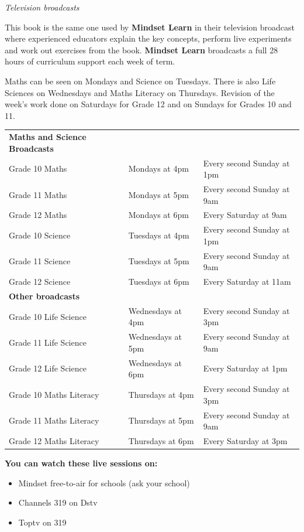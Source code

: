 {{\normalfont\sffamily\fontsize{22}\normalfont\itshape Television broadcasts} \par
This book is the same one used by \textbf{Mindset Learn} in their television broadcast where experienced
educators explain the key concepts, perform live experiments and work out exercises from the book.
\textbf{Mindset Learn} broadcasts a full 28 hours of curriculum support each week of term. \par


Maths can be seen on Mondays and Science on Tuesdays. There is also Life Sciences on Wednesdays
and Maths Literacy on Thursdays. Revision of the week's work done on Saturdays for Grade 12 and on
Sundays for Grades 10 and 11.


}




\newpage
\thispagestyle{empty}
{\Large

\begin{table}[h]
\large
\begin{tabular}{lll}
\textbf{Maths and Science Broadcasts}&&\\
Grade 10  Maths & Mondays at 4pm & Every second Sunday at 1pm\\
Grade 11  Maths & Mondays at 5pm & Every second Sunday at 9am\\
Grade 12  Maths & Mondays at 6pm & Every Saturday at 9am\\
Grade 10  Science & Tuesdays at 4pm & Every second Sunday at 1pm\\
Grade 11  Science & Tuesdays at 5pm & Every second Sunday at 9am\\
Grade 12  Science & Tuesdays at 6pm & Every Saturday at 11am\\
\textbf{Other broadcasts} & & \\
Grade 10  Life Science & Wednesdays at 4pm & Every second Sunday at 3pm\\
Grade 11  Life Science & Wednesdays at 5pm & Every second Sunday at 9am\\
Grade 12  Life Science & Wednesdays at 6pm & Every Saturday at 1pm\\
Grade 10  Maths Literacy & Thursdays at 4pm & Every second Sunday at 3pm\\
Grade 11  Maths Literacy & Thursdays at 5pm & Every second Sunday at 9am\\
Grade 12  Maths Literacy & Thursdays at 6pm & Every Saturday at 3pm\\
\end{tabular}
\end{table}


\textbf{You can watch these live sessions on:}
\begin{itemize}
    \item Mindset free-to-air for schools (ask your school)
    \item Channels 319 on Dstv
    \item Toptv on 319
\end{itemize}


}



\normalfont
